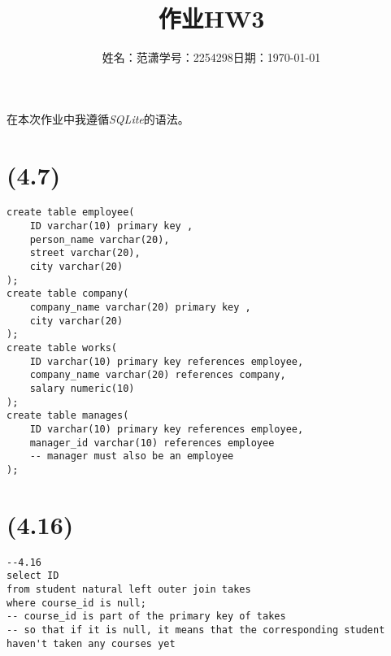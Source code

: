 \documentclass[a4paper]{article}
\title{作业{\hspace{1ex}}HW3}
\author{姓名：范潇{\quad}学号：2254298{\quad}日期：\today}
\date{}
\begin{document}
\maketitle
在本次作业中我遵循\emph{SQLite}的语法。
\section{(4.7)}
\begin{lstlisting}
create table employee(
    ID varchar(10) primary key ,
    person_name varchar(20),
    street varchar(20),
    city varchar(20)
);
create table company(
    company_name varchar(20) primary key ,
    city varchar(20)
);
create table works(
    ID varchar(10) primary key references employee,
    company_name varchar(20) references company,
    salary numeric(10)
);
create table manages(
    ID varchar(10) primary key references employee,
    manager_id varchar(10) references employee
    -- manager must also be an employee
);
\end{lstlisting}
\section{(4.16)}
\begin{lstlisting}
--4.16
select ID
from student natural left outer join takes
where course_id is null;
-- course_id is part of the primary key of takes
-- so that if it is null, it means that the corresponding student haven't taken any courses yet
\end{lstlisting}
\end{document}
